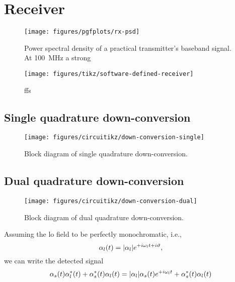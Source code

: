 \section{Receiver}
\FloatBarrier


\begin{figure}[htb]
	\centering
	\texttt{[image: figures/pgfplots/rx-psd]}
	\caption{Power spectral density of a practical transmitter's baseband signal. At \SI{100}{\mega\hertz} a strong }\label{fig:transmit_spectrum}
\end{figure}

\begin{figure}[htb]
	\centering
	\texttt{[image: figures/tikz/software-defined-receiver]}
	\caption{ffs}
\end{figure}

\FloatBarrier
\subsection{Single quadrature down-conversion}

\begin{figure}[htb]
	\centering
	\texttt{[image: figures/circuitikz/down-conversion-single]}
	\caption{Block diagram of single quadrature down-conversion.}\label{fig:down_conversion_single}
\end{figure}

\FloatBarrier
\subsection{Dual quadrature down-conversion}

\begin{figure}[htb]
	\centering
	\texttt{[image: figures/circuitikz/down-conversion-dual]}
	\caption{Block diagram of dual quadrature down-conversion.}\label{fig:down_conversion_dual}
\end{figure}



Assuming the \gls{lo} field to be perfectly monochromatic, i.e.,
\begin{equation}
	\alpha_l(t)
	=
	\lvert\alpha_l\rvert
	e^{+i\omega_lt+i\vartheta}
	,
\end{equation}
we can write the detected signal
\begin{equation}
	\alpha_s(t)
	\alpha_l^*(t)
	+
	\alpha_s^*(t)
	\alpha_l(t)
	=
	\lvert\alpha_l\rvert
	\alpha_s(t)
	e^{+i\omega_l t}
	+
	\alpha_s^*(t)
	\alpha_l(t)	
\end{equation}

